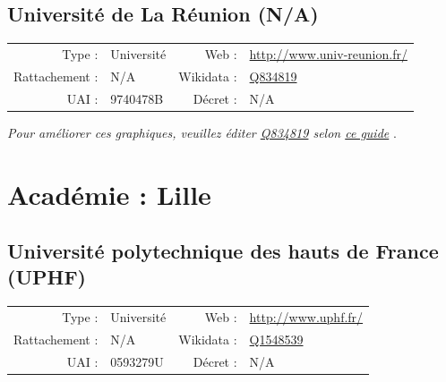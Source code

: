 \documentclass[12pt,french,landscape]{article}
\begin{document}
\hypertarget{universituxe9-de-la-ruxe9union-na}{%
\subsection{Université de La Réunion
(N/A)}\label{universituxe9-de-la-ruxe9union-na}}

\begin{tabular*}{0.45\textwidth}{rp{2cm}rl}  
\hline  
Type : & Université & Web : &\href{http://www.univ-reunion.fr/}{http://www.univ-reunion.fr/} \\  
Rattachement : & N/A & Wikidata : & \href{https://www.wikidata.org/entity/Q834819}{Q834819} \\  
UAI : & 9740478B & Décret : & N/A \\  
\hline  
\end{tabular*}

\textit{\scriptsize Pour améliorer ces graphiques, veuillez éditer \href{https://www.wikidata.org/entity/Q834819}{Q834819}  selon \href{https://github.com/cpesr/wikidataESR/blob/master/Rmd/wikidataESR.md}{ce guide}}
.


\newpage

\hypertarget{acaduxe9mie-lille}{%
\section{Académie : Lille}\label{acaduxe9mie-lille}}

\hypertarget{universituxe9-polytechnique-des-hauts-de-france-uphf}{%
\subsection{Université polytechnique des hauts de France
(UPHF)}\label{universituxe9-polytechnique-des-hauts-de-france-uphf}}

\begin{tabular*}{0.45\textwidth}{rp{2cm}rl}  
\hline  
Type : & Université & Web : &\href{http://www.uphf.fr/}{http://www.uphf.fr/} \\  
Rattachement : & N/A & Wikidata : & \href{https://www.wikidata.org/entity/Q1548539}{Q1548539} \\  
UAI : & 0593279U & Décret : & N/A \\  
\hline  
\end{tabular*}
\end{document}
